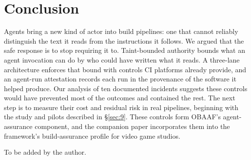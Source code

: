 \documentclass[acmsmall,screen,review]{acmart}
\begin{document}
\section{Conclusion}\label{sec:12}

Agents bring a new kind of actor into build pipelines: one that cannot reliably distinguish the text it reads from the instructions it follows. We argued that the safe response is to stop requiring it to. Taint-bounded authority bounds what an agent invocation can do by who could have written what it reads. A three-lane architecture enforces that bound with controls CI platforms already provide, and an agent-run attestation records each run in the provenance of the software it helped produce. Our analysis of ten documented incidents suggests these controls would have prevented most of the outcomes and contained the rest. The next step is to measure their cost and residual risk in real pipelines, beginning with the study and pilots described in \S\ref{sec:9}. These controls form OBAAF's agent-assurance component, and the companion paper incorporates them into the framework's build-assurance profile for video game studios.

\begin{acks}
To be added by the author.

\end{acks}



\end{document}
